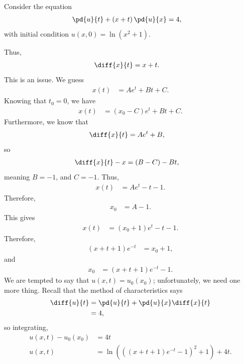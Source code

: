\documentclass[10pt]{mypackage}
\begin{document}
\begin{example}
  Consider the equation
  \begin{align*}
    \pd{u}{t} + \left( x + t \right)\pd{u}{x} &= 4,
  \end{align*}
  with initial condition $u\left( x,0 \right) = \ln\left( x^2 + 1 \right)$.\newline

  Thus,
  \begin{align*}
    \diff{x}{t} &= x + t.
  \end{align*}
  This is an issue. We guess
  \begin{align*}
    x(t) &= Ae^{t} + Bt + C.
  \end{align*}
  Knowing that $t_0 = 0$, we have
  \begin{align*}
    x(t) &= \left( x_0 - C \right)e^{t} + Bt + C.
  \end{align*}
  Furthermore, we know that
  \begin{align*}
    \diff{x}{t} &= Ae^{t} + B,
  \end{align*}
  so
  \begin{align*}
    \diff{x}{t} - x &= \left( B-C \right) - Bt,
  \end{align*}
  meaning $B = -1$, and $C = -1$. Thus,
  \begin{align*}
    x(t) &= Ae^{t} - t - 1.
  \end{align*}
  Therefore,
  \begin{align*}
    x_0 &= A-1.
  \end{align*}
  This gives
  \begin{align*}
    x(t) &= \left( x_0 + 1 \right)e^{t} - t - 1.
  \end{align*}
  Therefore,
  \begin{align*}
    \left( x+ t+ 1 \right)e^{-t} &= x_0 + 1,
  \end{align*}
  and
  \begin{align*}
    x_0 &= \left( x + t + 1 \right)e^{-t} - 1.
  \end{align*}
  We are tempted to say that $u\left( x,t \right) = u_0\left( x_0 \right)$; unfortunately, we need one more thing. Recall that the method of characteristics says
  \begin{align*}
    \diff{u}{t} &= \pd{u}{t} + \pd{u}{x}\diff{x}{t}\\
                &= 4,
  \end{align*}
  so integrating,
  \begin{align*}
    u\left( x,t \right) - u_0\left( x_0 \right) &= 4t\\
    u\left( x,t \right) &= \ln\left( \left( \left( x + t + 1 \right)e^{-t} - 1 \right)^2 + 1 \right) + 4t.
  \end{align*}
\end{example}
\end{document}

